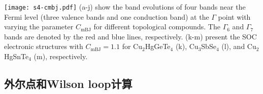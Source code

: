 \begin{figure*}[!htbp]
    \centering
    \texttt{[image: s4-cmbj.pdf]}
    {(a-j) show the band evolutions of four bands near the Fermi level (three valence bands and one conduction band) at the $\Gamma$ point with varying the parameter $C_\text{mBJ}$ for different topological compounds.  The $\Gamma_6$ and $\Gamma_7$ bands are denoted by the red and blue lines, respectively.
    (k-m) present the SOC electronic structures with $C_\text{mBJ}=1.1$ for Cu$_2$HgGeTe$_4$ (k), Cu$_3$SbSe$_4$ (l), and Cu$_2$HgSnTe$_4$ (m), respectively. ~\citep{Qians4}
    }
    \label{fig:5-mbj}
\end{figure*}


\subsection{外尔点和Wilson loop计算}

